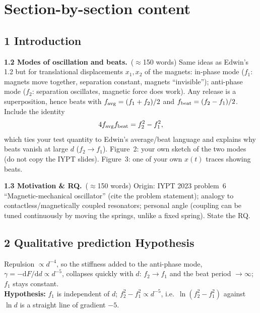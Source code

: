 \documentclass[11pt,a4paper]{article}
\newcommand{\words}[1]{~{\small\color{gray}($\approx$#1 words)}}
\begin{document}
\section{Section-by-section content}

\subsection*{1 Introduction}
\textbf{1.2 Modes of oscillation and beats.}\words{150}
Same ideas as Edwin's 1.2 but for translational displacements $x_1,x_2$ of the magnets:
in-phase mode ($f_1$: magnets move together, separation constant, magnets ``invisible'');
anti-phase mode ($f_2$: separation oscillates, magnetic force does work). Any release is a
superposition, hence beats with $f_{\rm avg}=(f_1+f_2)/2$ and $f_{\rm beat}=(f_2-f_1)/2$.
Include the identity
\begin{equation}
  4 f_{\rm avg} f_{\rm beat} = f_2^2 - f_1^2 ,
\end{equation}
which ties your test quantity to Edwin's average/beat language and explains why beats
vanish at large $d$ ($f_2\to f_1$). Figure~2: your own sketch of the two modes (do not
copy the IYPT slides). Figure~3: one of your own $x(t)$ traces showing beats.

\textbf{1.3 Motivation \& RQ.}\words{150}
Origin: IYPT 2023 problem~6 ``Magnetic-mechanical oscillator'' (cite the problem
statement); analogy to contactless/magnetically coupled resonators; personal angle
(coupling can be tuned continuously by moving the springs, unlike a fixed spring). State
the RQ.

\subsection*{2 Qualitative prediction  Hypothesis}
Repulsion $\propto d^{-4}$, so the stiffness added to the anti-phase mode,
$\gamma=-\mathrm{d}F/\mathrm{d}d\propto d^{-5}$, collapses quickly with $d$: $f_2\to f_1$ and
the beat period $\to\infty$; $f_1$ stays constant.\\
\textbf{Hypothesis:} $f_1$ is independent of $d$; $f_2^2-f_1^2\propto d^{-5}$, i.e.\
$\ln(f_2^2-f_1^2)$ against $\ln d$ is a straight line of gradient $-5$.
\end{document}
